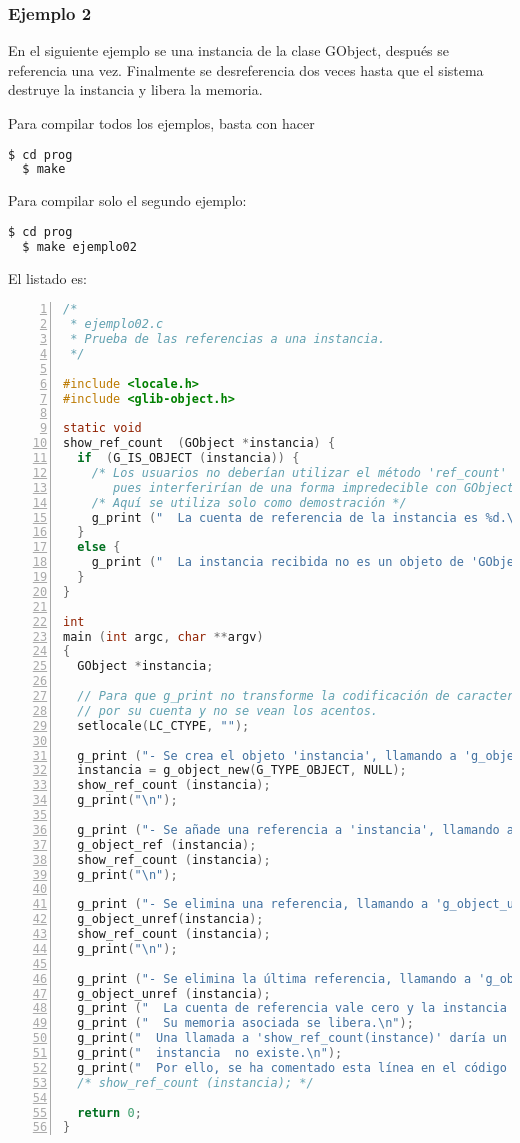 \subsubsection{Ejemplo 2}
En el siguiente ejemplo se una instancia de la clase \textsf{GObject}, después se referencia una vez.
Finalmente se desreferencia dos veces hasta que el sistema destruye la instancia y libera la memoria.

Para compilar todos los ejemplos, basta con hacer
\begin{lstlisting}[language=bash]
  $ cd prog
  $ make
\end{lstlisting}
Para compilar solo el segundo ejemplo:
\begin{lstlisting}[language=bash]
  $ cd prog
  $ make ejemplo02
\end{lstlisting}

El listado es:
\begin{lstlisting}[language=C, numbers=left]
/*
 * ejemplo02.c
 * Prueba de las referencias a una instancia.
 */

#include <locale.h>
#include <glib-object.h>

static void
show_ref_count  (GObject *instancia) {
  if  (G_IS_OBJECT (instancia)) {
    /* Los usuarios no deberían utilizar el método 'ref_count' en sus programas.
       pues interferirían de una forma impredecible con GObject */
    /* Aquí se utiliza solo como demostración */
    g_print ("  La cuenta de referencia de la instancia es %d.\n", instancia->ref_count);
  }
  else {
    g_print ("  La instancia recibida no es un objeto de 'GObjectClass'.\n");
  }
}

int
main (int argc, char **argv)
{
  GObject *instancia;

  // Para que g_print no transforme la codificación de caracteres
  // por su cuenta y no se vean los acentos.
  setlocale(LC_CTYPE, "");

  g_print ("- Se crea el objeto 'instancia', llamando a 'g_object_new'.\n");
  instancia = g_object_new(G_TYPE_OBJECT, NULL);
  show_ref_count (instancia);
  g_print("\n");
  
  g_print ("- Se añade una referencia a 'instancia', llamando a 'g_object_ref'.\n");
  g_object_ref (instancia);
  show_ref_count (instancia);
  g_print("\n");

  g_print ("- Se elimina una referencia, llamando a 'g_object_unref'.\n");
  g_object_unref(instancia);
  show_ref_count (instancia);
  g_print("\n");

  g_print ("- Se elimina la última referencia, llamando a 'g_object_unref'.\n");
  g_object_unref (instancia);
  g_print ("  La cuenta de referencia vale cero y la instancia se destruye.\n");
  g_print ("  Su memoria asociada se libera.\n");
  g_print("  Una llamada a 'show_ref_count(instance)' daría un error, pues la\n");
  g_print("  instancia  no existe.\n");
  g_print("  Por ello, se ha comentado esta línea en el código fuente.\n");
  /* show_ref_count (instancia); */
  
  return 0;
}
\end{lstlisting}

